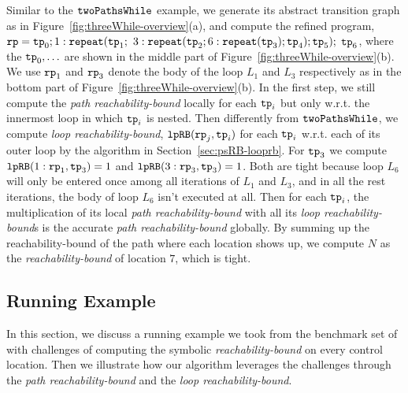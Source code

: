 Similar to the $\mathtt{twoPathsWhile}$ example, we generate its abstract transition graph as in Figure~\ref{fig:threeWhile-overview}(a),
and compute the refined program,
$\mathtt{rp} = \mathtt{tp}_0; 1: \mathtt{repeat}(\mathtt{tp}_1;$ 
$3: {\mathtt{repeat}(\mathtt{tp}_2; 6 : {\mathtt{repeat}(\mathtt{tp}_3)}; \mathtt{tp}_4)}; \mathtt{tp}_5);$ 
$\mathtt{tp}_6$,
where the $\mathtt{tp}_0, \ldots$ are shown in the middle part of Figure~\ref{fig:threeWhile-overview}(b).
We use $\mathtt{rp}_1$ and $\mathtt{rp}_3$ denote the body of the loop $L_1$ and $L_3$ respectively as in the bottom part of Figure~\ref{fig:threeWhile-overview}(b).
In the first step, we still compute the \emph{path reachability-bound} locally for each $\mathtt{tp}_i$ but only w.r.t. the innermost loop in which $\mathtt{tp}_i$ is nested.
Then differently from $\mathtt{twoPathsWhile}$,
we compute \emph{loop reachability-bound}, $\mathtt{lpRB}(\mathtt{rp}_j, \mathtt{tp}_i)$ for each $\mathtt{tp}_i$ w.r.t. each of its outer loop by the algorithm in Section~\ref{sec:psRB-looprb}.
For $\mathtt{tp}_3$ we compute
$\mathtt{lpRB}(1: \mathtt{rp}_1, \mathtt{tp}_3) = 1$ and
$\mathtt{lpRB}(3: \mathtt{rp}_3, \mathtt{tp}_3) = 1$.
Both are tight because loop $L_6$ will only be entered once among all iterations of $L_1$ and $L_3$, and in all the rest iterations, the body of loop $L_6$ isn't executed at all.
Then for each $\mathtt{tp}_i$, the multiplication of its local \emph{path reachability-bound} with all its \emph{loop reachability-bound}s is the accurate \emph{path reachability-bound} globally.
By summing up the reachability-bound of the path where each location shows up,
we compute $N$ as the \emph{reachability-bound} of location $7$, which is tight.




\subsection{Running Example}
In this section, we discuss a running example we took from
the benchmark set of~\cite{GulwaniZ10} with
challenges of computing the symbolic
\emph{reachability-bound} on
every control location. Then we illustrate how our algorithm leverages the challenges through the \emph{path reachability-bound} and the \emph{loop reachability-bound}.

